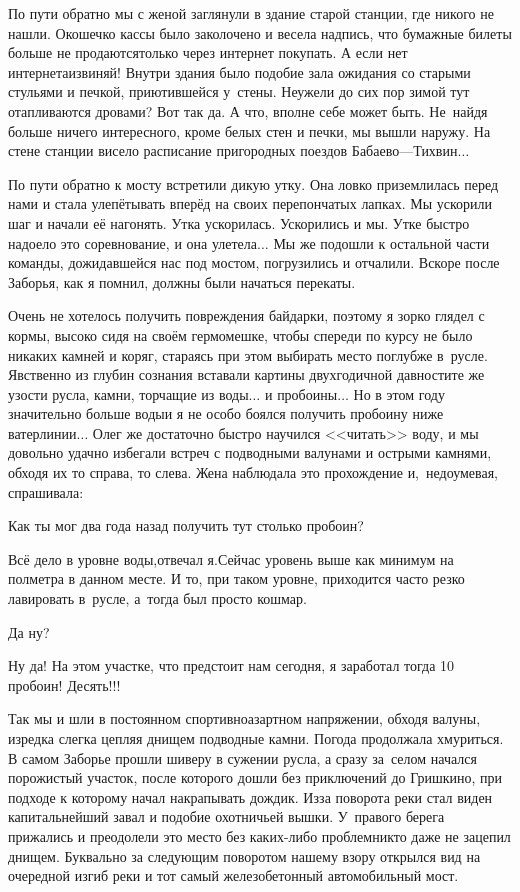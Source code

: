 По пути обратно мы с женой заглянули в здание старой станции, где никого не нашли. Окошечко кассы было заколочено и весела надпись, что бумажные билеты больше не продаются\mdash только через интернет покупать. А если нет интернета\mdash извиняй! Внутри здания было подобие зала ожидания со старыми стульями и печкой, приютившейся у~стены. Неужели до сих пор зимой тут отапливаются дровами? Вот так да. А что, вполне себе может быть. Не~найдя больше ничего интересного, кроме белых стен и печки, мы вышли наружу. На стене станции висело расписание пригородных поездов Бабаево\thinspace---\thinspace Тихвин$\ldots$ 

По пути обратно к мосту встретили дикую утку. Она ловко приземлилась перед нами и стала улепётывать вперёд на своих перепончатых лапках. Мы ускорили шаг и начали её нагонять. Утка ускорилась. Ускорились и мы. Утке быстро надоело это соревнование, и она улетела$\ldots$ Мы же подошли к остальной части команды, дожидавшейся нас под мостом, погрузились и отчалили. Вскоре после Заборья, как я помнил, должны были начаться перекаты.

Очень не хотелось получить повреждения байдарки, поэтому я зорко глядел с кормы, высоко сидя на своём гермомешке, чтобы спереди по курсу не было никаких камней и коряг, стараясь при этом выбирать место поглубже в~русле. Явственно из глубин сознания вставали картины двухгодичной давности\mdash те же узости русла, камни, торчащие из воды$\ldots$ и пробоины$\ldots$ Но в этом году значительно больше воды\mdash и я не особо боялся получить пробоину ниже ватерлинии$\ldots$ Олег же достаточно быстро научился <<читать>> воду, и мы довольно удачно избегали встреч с подводными валунами и острыми камнями, обходя их то справа, то слева. Жена наблюдала это прохождение и,~недоумевая, спрашивала:

\diagdash Как ты мог два года назад получить тут столько пробоин? 

\diagdash Всё дело в уровне воды,\mdash отвечал я.\mdash Сейчас уровень выше как минимум на полметра в данном месте. И то, при таком уровне, приходится часто резко лавировать в~русле, а~тогда был просто кошмар.

\diagdash Да ну?

\diagdash Ну да! На этом участке, что предстоит нам сегодня, я заработал тогда 10 пробоин! Десять!!!

Так мы и шли в постоянном спортивно\sdash азартном напряжении, обходя валуны, изредка слегка цепляя днищем подводные камни. Погода продолжала хмуриться. В самом Заборье прошли шиверу в сужении русла, а сразу за~селом начался порожистый участок, после которого дошли без приключений до Гришкино, при подходе к которому начал накрапывать дождик. Из\sdash за поворота реки стал виден капитальнейший завал и подобие охотничьей вышки. У~правого берега прижались и преодолели это место без каких-либо проблем\mdash никто даже не зацепил днищем. Буквально за следующим поворотом нашему взору открылся вид на очередной изгиб реки и тот самый железобетонный автомобильный мост. 

